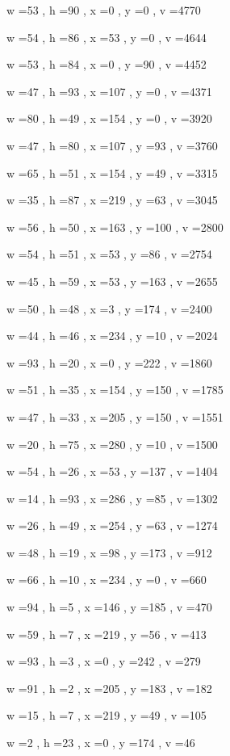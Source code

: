 \documentclass[11pt]{article}
\begin{document}
w =53 , h =90 , x =0 , y =0 , v =4770
\par
w =54 , h =86 , x =53 , y =0 , v =4644
\par
w =53 , h =84 , x =0 , y =90 , v =4452
\par
w =47 , h =93 , x =107 , y =0 , v =4371
\par
w =80 , h =49 , x =154 , y =0 , v =3920
\par
w =47 , h =80 , x =107 , y =93 , v =3760
\par
w =65 , h =51 , x =154 , y =49 , v =3315
\par
w =35 , h =87 , x =219 , y =63 , v =3045
\par
w =56 , h =50 , x =163 , y =100 , v =2800
\par
w =54 , h =51 , x =53 , y =86 , v =2754
\par
w =45 , h =59 , x =53 , y =163 , v =2655
\par
w =50 , h =48 , x =3 , y =174 , v =2400
\par
w =44 , h =46 , x =234 , y =10 , v =2024
\par
w =93 , h =20 , x =0 , y =222 , v =1860
\par
w =51 , h =35 , x =154 , y =150 , v =1785
\par
w =47 , h =33 , x =205 , y =150 , v =1551
\par
w =20 , h =75 , x =280 , y =10 , v =1500
\par
w =54 , h =26 , x =53 , y =137 , v =1404
\par
w =14 , h =93 , x =286 , y =85 , v =1302
\par
w =26 , h =49 , x =254 , y =63 , v =1274
\par
w =48 , h =19 , x =98 , y =173 , v =912
\par
w =66 , h =10 , x =234 , y =0 , v =660
\par
w =94 , h =5 , x =146 , y =185 , v =470
\par
w =59 , h =7 , x =219 , y =56 , v =413
\par
w =93 , h =3 , x =0 , y =242 , v =279
\par
w =91 , h =2 , x =205 , y =183 , v =182
\par
w =15 , h =7 , x =219 , y =49 , v =105
\par
w =2 , h =23 , x =0 , y =174 , v =46
\par
\newpage
\end{document}
